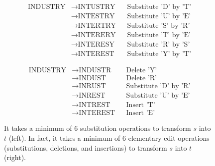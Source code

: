 \begin{figure}[b]
\small
\begin{minipage}[l]{0.50\textwidth}
\begin{align*}
\text{INDUSTRY} &\rightarrow \text{INTUSTRY} &&\text{Substitute 'D' by 'T'}\\
&\rightarrow \text{INTESTRY} &&\text{Substitute 'U' by 'E'}\\
&\rightarrow \text{INTERTRY} &&\text{Substitute 'S' by 'R'}\\
&\rightarrow \text{INTERERY} &&\text{Substitute 'T' by 'E'}\\
&\rightarrow \text{INTERESY} &&\text{Substitute 'R' by 'S'}\\
&\rightarrow \text{INTEREST} &&\text{Substitute 'Y' by 'T'}
\end{align*}
\end{minipage}%
\hspace{4ex} \begin{minipage}[r]{0.50\textwidth}
\begin{align*}
\text{INDUSTRY} &\rightarrow \text{INDUSTR} &&\text{Delete 'Y'}\\
&\rightarrow \text{INDUST} &&\text{Delete 'R'}\\
&\rightarrow \text{INRUST} &&\text{Substitute 'D' by 'R'}\\
&\rightarrow \text{INREST} &&\text{Substitute 'U' by 'E'}\\
&\rightarrow \text{INTREST} &&\text{Insert 'T'}\\
&\rightarrow \text{INTEREST} &&\text{Insert 'E'}
\end{align*}
\end{minipage}
\caption{It takes a minimum of 6 substitution operations to transform $s$ into $t$ (left). In fact, it takes a minimum of 6 elementary edit operations (substitutions, deletions, and insertions)  to transform $s$ into $t$ (right).}
\label{editdistex}
\end{figure}
